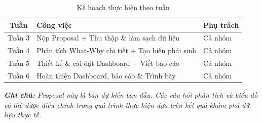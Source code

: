 \documentclass[12pt,a4paper]{article}
\begin{document}
\begin{table}[h!]
\centering
\renewcommand{\arraystretch}{1.4}
\begin{tabularx}{\textwidth}{|c|X|L{3cm}|}
    \hline
    \textbf{Tuần} & \textbf{Công việc} & \textbf{Phụ trách} \\
    \hline
    Tuần 3 & Nộp Proposal + Thu thập \& làm sạch dữ liệu & Cả nhóm \\
    \hline
    Tuần 4 & Phân tích What-Why chi tiết + Tạo biến phái sinh & Cả nhóm \\
    \hline
    Tuần 5 & Thiết kế \& cài đặt Dashboard + Viết báo cáo & Cả nhóm \\
    \hline
    Tuần 6 & Hoàn thiện Dashboard, báo cáo \& Trình bày & Cả nhóm \\
    \hline
\end{tabularx}
\caption{Kế hoạch thực hiện theo tuần}
\end{table}

\vspace{1cm}
\noindent\textit{\textbf{Ghi chú:} Proposal này là bản dự kiến ban đầu. Các câu hỏi phân tích và biểu đồ có thể được điều chỉnh trong quá trình thực hiện dựa trên kết quả khám phá dữ liệu thực tế.}
\end{document}
